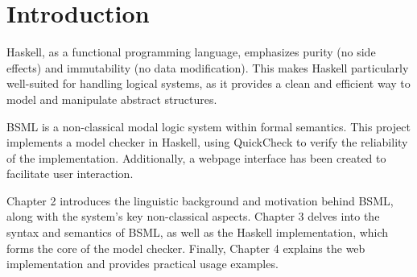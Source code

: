 
\section{Introduction}\label{sec:Introduction}

Haskell, as a functional programming language, 
emphasizes purity (no side effects) and immutability (no data modification). 
This makes Haskell particularly well-suited for handling logical systems, 
as it provides a clean and efficient way to model and manipulate abstract structures. 

BSML is a non-classical modal logic system within formal semantics. This project implements a model checker in Haskell, 
using QuickCheck to verify the reliability of the implementation. 
Additionally, a webpage interface has been created to facilitate user interaction. 

Chapter 2 introduces the linguistic background and motivation behind BSML, along with the system's key non-classical aspects. 
Chapter 3 delves into the syntax and semantics of BSML, as well as the Haskell implementation, which forms the core of the model checker. 
Finally, Chapter 4 explains the web implementation and provides practical usage examples.